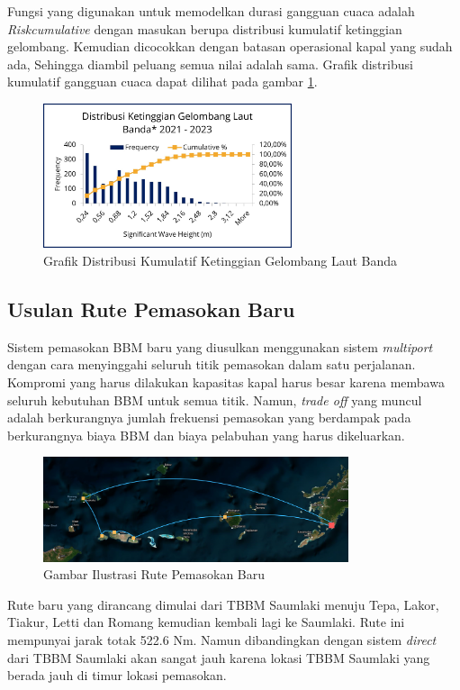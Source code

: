 Fungsi yang digunakan untuk memodelkan durasi gangguan cuaca adalah \emph{Riskcumulative} dengan masukan berupa distribusi kumulatif ketinggian gelombang. Kemudian dicocokkan dengan batasan operasional kapal yang sudah ada, Sehingga diambil peluang semua nilai adalah sama. Grafik distribusi kumulatif gangguan cuaca dapat dilihat pada gambar \ref{fig:grafik-kumulatif-durasi-gangguan-cuaca-1st}.

\begin{figure}[htbp!]
    \centering
    \includegraphics[width=0.65\textwidth]{grafik/distribusi-gelombang-kabupaten-mbd.jpg}
    \caption{Grafik Distribusi Kumulatif Ketinggian Gelombang Laut Banda}
    \label{fig:grafik-kumulatif-durasi-gangguan-cuaca-1st}
\end{figure}

\subsection{Usulan Rute Pemasokan Baru}
\label{subsec:usulan-rute-baru}

    Sistem pemasokan BBM baru yang diusulkan menggunakan sistem \emph{multiport} dengan cara menyinggahi seluruh titik pemasokan dalam satu perjalanan. Kompromi yang harus dilakukan kapasitas kapal harus besar karena membawa seluruh kebutuhan BBM untuk semua titik. Namun, \emph{trade off} yang muncul adalah berkurangnya jumlah frekuensi pemasokan yang berdampak pada berkurangnya biaya BBM dan biaya pelabuhan yang harus dikeluarkan.

\begin{figure}[htbp!]
    \centering
    \includegraphics[width=0.8\textwidth]{gambar/rute-baru.png}
    \caption{Gambar Ilustrasi Rute Pemasokan Baru}
    \label{fig:rute-baru}
\end{figure}

    Rute baru yang dirancang dimulai dari TBBM Saumlaki menuju Tepa, Lakor, Tiakur, Letti dan Romang kemudian kembali lagi ke Saumlaki. Rute ini mempunyai jarak totak 522.6 Nm. Namun dibandingkan dengan sistem \emph{direct} dari TBBM Saumlaki akan sangat jauh karena lokasi TBBM Saumlaki yang berada jauh di timur lokasi pemasokan.